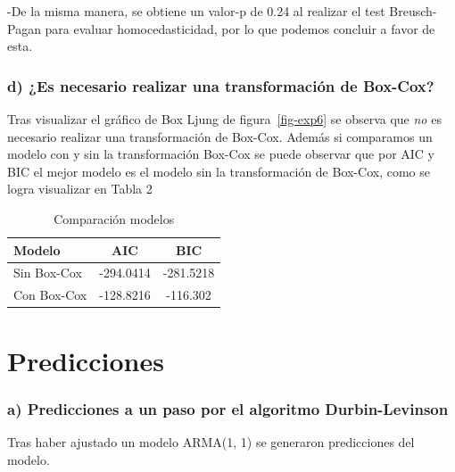 \documentclass[
  letterpaper,
  DIV=11,
  numbers=noendperiod,
  twocolumn]{scrartcl}
\begin{document}
-De la misma manera, se obtiene un valor-p de 0.24 al realizar el test
Breusch-Pagan para evaluar homocedasticidad, por lo que podemos concluir
a favor de esta.

\hypertarget{d-es-necesario-realizar-una-transformaciuxf3n-de-box-cox}{%
\subsubsection{d) ¿Es necesario realizar una transformación de
Box-Cox?}\label{d-es-necesario-realizar-una-transformaciuxf3n-de-box-cox}}

Tras visualizar el gráfico de Box Ljung de figura~\ref{fig-exp6} se
observa que \emph{no} es necesario realizar una transformación de
Box-Cox. Además si comparamos un modelo con y sin la transformación
Box-Cox se puede observar que por AIC y BIC el mejor modelo es el modelo
sin la transformación de Box-Cox, como se logra visualizar en Tabla 2

\begin{table}[H]
  \centering
  \caption{Comparación modelos}
  \begin{tabular}{lcc}
    \toprule
    Modelo & AIC & BIC \\
    \midrule
    Sin Box-Cox & -294.0414 & -281.5218 \\
    Con Box-Cox & -128.8216 & -116.302  \\
    \bottomrule
  \end{tabular}
  
\end{table}

\hypertarget{predicciones}{%
\section{Predicciones}\label{predicciones}}

\hypertarget{a-predicciones-a-un-paso-por-el-algoritmo-durbin-levinson}{%
\subsubsection{a) Predicciones a un paso por el algoritmo
Durbin-Levinson}\label{a-predicciones-a-un-paso-por-el-algoritmo-durbin-levinson}}

Tras haber ajustado un modelo ARMA(1, 1) se generaron predicciones del
modelo.
\end{document}
